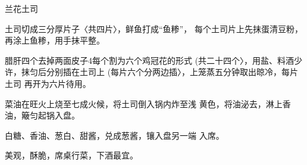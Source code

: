 \begin{recipe}{兰花土司}

\ingredients


\cooking

土司切成三分厚片子〈共四片〉，鲜鱼打成“鱼糁”， 每个土司片上先抹蛋清豆粉，再涂上鱼糁，用手抹平整。

\step 腊肝四个去掉两面皮子4每个割为六个鸡冠花的形式 (共二十四个〉，用盐、料酒少许，抹匀后分别插在土司上 (每片六个分两边插〉，上笼蒸五分钟取出晾冷，每片土司 再开为六片待用。

菜油在旺火上烧至七成火候，将土司倒入锅内炸至浅 黄色，将油泌去，淋上香油，簸匀起锅入盘。

\step 白糖、香油、葱白、甜酱，兑成葱酱，镶入盘另一端 入席。

\notes

美观，酥脆，席桌行菜，下酒最宜。

\end{recipe}

